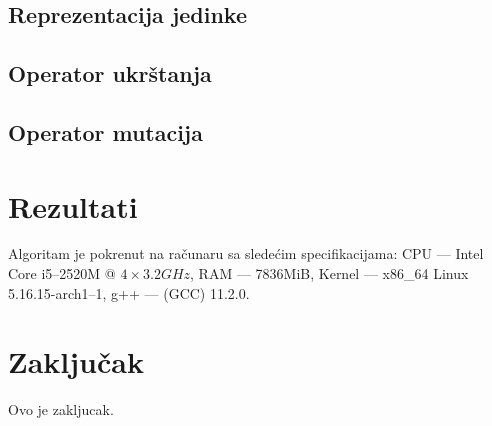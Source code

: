 \documentclass[a4paper,12pt,twocolumn]{article}
\begin{document}
\subsection{Reprezentacija jedinke}

\subsection{Operator ukrštanja}

\subsection{Operator mutacija}

\section{Rezultati}

Algoritam je pokrenut na računaru sa sledećim specifikacijama: 
CPU --- Intel Core i5--2520M @ $4 \times 3.2GHz$,
RAM --- 7836MiB,
Kernel --- x86\_64 Linux 5.16.15-arch1--1,
g++ --- (GCC) 11.2.0.



\section{Zaključak}

Ovo je zakljucak.

\nocite{*}

\printbibliography[title={Literatura}]
\end{document}
